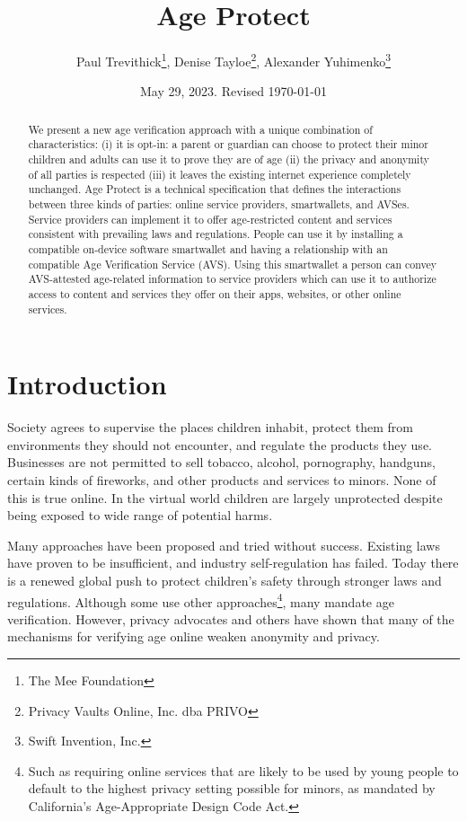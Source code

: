 \documentclass[11pt, oneside]{article}   	%
\title{Age Protect}
\author{Paul Trevithick\footnote{The Mee Foundation}, Denise Tayloe\footnote{Privacy Vaults Online, Inc. dba PRIVO}, Alexander Yuhimenko\footnote{Swift Invention, Inc.}}
\date{May 29, 2023. Revised \today}
\begin{document}
\maketitle
\begin{abstract}
	We present a new age verification approach with a unique combination of characteristics: (i) it is opt-in: a parent or guardian can choose to protect their minor children and adults can use it to prove they are of age (ii) the privacy and anonymity of all parties is respected (iii) it leaves the existing internet experience completely unchanged. Age Protect is a technical specification that defines the interactions between three kinds of parties: online service providers, smartwallets, and AVSes. Service providers can implement it to offer age-restricted content and services consistent with prevailing laws and regulations. People can use it by installing a compatible on-device software smartwallet and having a relationship with an compatible Age Verification Service (AVS). Using this smartwallet a person can convey AVS-attested age-related information to service providers which can use it to authorize access to content and services they offer on their apps, websites, or other online services. 
\end{abstract}

\section{Introduction}

Society agrees to supervise the places children inhabit, protect them from environments they should not encounter, and regulate the products they use. Businesses are not permitted to sell tobacco, alcohol, pornography, handguns, certain kinds of fireworks, and other products and services to minors. None of this is true online. In the virtual world children are largely unprotected despite being exposed to wide range of potential harms. 

Many approaches have been proposed and tried without success. Existing laws have proven to be insufficient, and industry self-regulation has failed. Today there is a renewed global push to protect children's safety through stronger laws and regulations. Although some use other approaches\footnote{Such as requiring online services that are likely to be used by young people to default to the highest privacy setting possible for minors, as mandated by California's Age-Appropriate Design Code Act.}, many mandate age verification.\cite{Griswold2023}\cite{Jackson2023} However, privacy advocates and others have shown that many of the mechanisms for verifying age online weaken anonymity and privacy.\cite{Roth2023} 
\end{document}
